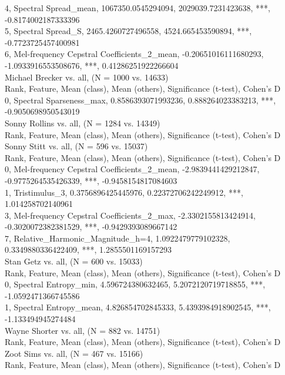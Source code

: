 4, Spectral Spread_mean, 1067350.0545294094, 2029039.7231423638, ***, -0.8174002187333396\\
5, Spectral Spread_S, 2465.4260727496558, 4524.665453590894, ***, -0.7723725457400981\\
6, Mel-frequency Cepstral Coefficients_2_mean, -0.20651016111680293, -1.0933916553508676, ***, 0.41286251922266604\\
Michael Brecker vs. all, (N = 1000 vs. 14633)\\
Rank, Feature, Mean (class), Mean (others), Significance (t-test), Cohen's D\\
0, Spectral Sparseness_max, 0.8586393071993236, 0.888264023383213, ***, -0.9050698950543019\\
Sonny Rollins vs. all, (N = 1284 vs. 14349)\\
Rank, Feature, Mean (class), Mean (others), Significance (t-test), Cohen's D\\
Sonny Stitt vs. all, (N = 596 vs. 15037)\\
Rank, Feature, Mean (class), Mean (others), Significance (t-test), Cohen's D\\
0, Mel-frequency Cepstral Coefficients_2_mean, -2.9839441429212847, -0.9775264535426339, ***, -0.9458154817084603\\
1, Tristimulus_3, 0.3756896425445976, 0.22372706242249912, ***, 1.014258702140961\\
3, Mel-frequency Cepstral Coefficients_2_max, -2.3302155813424914, -0.3020072382381529, ***, -0.9429393089667142\\
7, Relative_Harmonic_Magnitude_h=4, 1.0922479779102328, 0.3349880336422409, ***, 1.2855501169157293\\
Stan Getz vs. all, (N = 600 vs. 15033)\\
Rank, Feature, Mean (class), Mean (others), Significance (t-test), Cohen's D\\
0, Spectral Entropy_min, 4.596724380632465, 5.2072120719718855, ***, -1.0592471366745586\\
1, Spectral Entropy_mean, 4.826854702845333, 5.4393984918902545, ***, -1.133494945274484\\
Wayne Shorter vs. all, (N = 882 vs. 14751)\\
Rank, Feature, Mean (class), Mean (others), Significance (t-test), Cohen's D\\
Zoot Sims vs. all, (N = 467 vs. 15166)\\
Rank, Feature, Mean (class), Mean (others), Significance (t-test), Cohen's D\\
